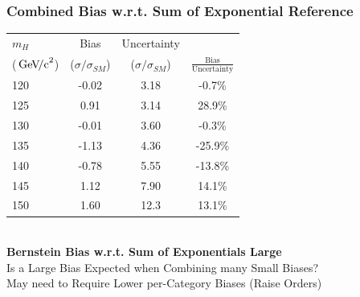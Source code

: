 \documentclass{beamer}
\newcommand{\GeVcc}{\ensuremath{\,\mathrm{Ge\kern -0.1em V\!/c}^2}}
\begin{document}
\begin{frame}
\frametitle{Combined Bias w.r.t. Sum of Exponential Reference}
  \begin{center}
    \scriptsize
    \begin{tabular}{|l|c|c|c|} \hline
$m_H$         & Bias & Uncertainty & \\ 
(\GeVcc{})         & ($\sigma/\sigma_{SM}$) & ($\sigma/\sigma_{SM}$) & $\frac{\mathrm{Bias}}{\mathrm{Uncertainty}}$ \\ \hline \hline
120   &      -0.02  &       3.18      &     -0.7\%    \\ \hline
125   &       0.91  &       3.14      &     28.9\%    \\ \hline
130   &      -0.01  &       3.60      &     -0.3\%    \\ \hline
135   &      -1.13  &       4.36      &    -25.9\%    \\ \hline
140   &      -0.78  &       5.55      &    -13.8\%    \\ \hline
145   &       1.12  &       7.90      &     14.1\%    \\ \hline
150   &       1.60  &      12.3       &     13.1\%    \\ \hline
    \end{tabular}
\\
  \small
\normalsize
\vspace{1em}
\textbf{Bernstein Bias w.r.t. Sum of Exponentials Large}
\\
Is a Large Bias Expected when Combining many Small Biases?
\\
May need to Require Lower per-Category Biases (Raise Orders)
  \end{center}
\end{frame}
\end{document}
